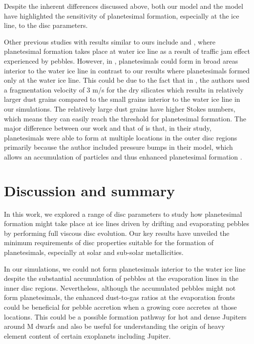 \documentclass{aa}
\begin{document}
Despite the inherent differences discussed above, both our model and the \citet{DrazkowskaAlibert2017} model have highlighted the sensitivity of planetesimal formation, especially at the ice line, to the disc parameters.

Other previous studies with results similar to ours include \cite{Schoonenberg2018} 
 and \cite{Kalyaan2023}, where planetesimal formation takes place at water ice line as a result of traffic jam effect experienced by pebbles. However, in \cite{Schoonenberg2018}, planetesimals could form in broad areas interior to the water ice line in contrast to our results where planetesimals formed only at the water ice line. This could be due to the fact that in \cite{Schoonenberg2018}, the authors used a fragmentation velocity of 3 m/s for the dry silicates which results in relatively larger dust grains compared to the small grains interior to the water ice line in our simulations. The relatively large dust grains have higher Stokes numbers, which means they can easily reach the threshold for planetesimal formation. The major difference between our work and that of \cite{Kalyaan2023} is that, in their study, planetesimals were able to form at multiple locations in the outer disc regions primarily because the author included pressure bumps in their model, which allows an accumulation of particles and thus enhanced planetesimal formation \citep[e.g.,][]{Johansen2007}. 

\section{Discussion and summary}\label{sec:discussion}

In this work, we explored a range of disc parameters to study how planetesimal formation might take place at ice lines driven by drifting and evaporating pebbles by performing full viscous disc evolution. Our key results have unveiled the minimum requirements of disc properties suitable for  the formation of planetesimals, especially at solar and sub-solar metallicities.

In our simulations, we could not form planetesimals interior to the water ice line despite the substantial accumulation of pebbles at the evaporation lines in the inner disc regions. Nevertheless, although the accumulated pebbles might not form planetesimals, the enhanced dust-to-gas ratios at the evaporation fronts could be beneficial for pebble accretion when a growing core accretes at those locations. This could be a possible formation pathway for hot and dense Jupiters around M dwarfs and also be useful for understanding the origin of heavy element content of certain exoplanets including Jupiter.
\end{document}
